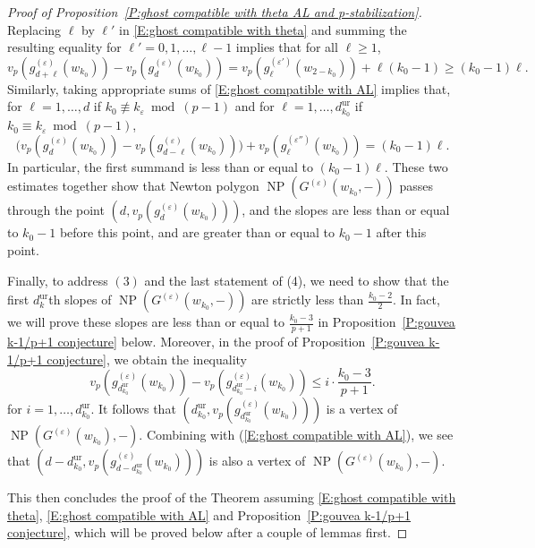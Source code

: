 \documentclass[12pt]{amsart}
\theoremstyle{definition}
\numberwithin{equation}{subsection}
\DeclareMathOperator{\NP}{NP}
\newcommand{\unr}{\mathrm{ur}}
\newcommand{\ur}{\mathrm{ur}}
\begin{document}
\begin{proof}[Proof of Proposition~\ref{P:ghost compatible with theta AL and p-stabilization}]
Replacing  $\ell$ by $\ell'$ in \eqref{E:ghost compatible with theta} and summing the resulting equality for $\ell' =0, 1, \dots, \ell-1$ implies that for all $\ell \geq 1$,
$$
v_p(g^{(\varepsilon)}_{d+\ell}(w_{k_0}))-v_p(g^{(\varepsilon)}_{d}(w_{k_0})) = v_p(g^{(\varepsilon')}_{\ell}(w_{2-{k_0}}))  +\ell({k_0}-1) \geq (k_0-1)\ell.
$$
Similarly, taking appropriate sums of \eqref{E:ghost compatible with AL} implies that, for $\ell = 1, \dots, d$ if ${k_0} \not\equiv k_\varepsilon \bmod{(p-1)}$ and for $\ell = 1, \dots, d_{k_0}^\unr$ if ${k_0} \equiv k_\varepsilon \bmod{(p-1)}$,
$$
\big(v_p(g^{(\varepsilon)}_d(w_{k_0})) - v_p(g^{(\varepsilon)}_{d-\ell}(w_{k_0})) \big) + v_p(g_\ell^{(\varepsilon'')}(w_{k_0})) = (k_0-1) \ell.
$$
In particular, the first summand is less than or equal to $(k_0-1)\ell$.
These two estimates together show that Newton polygon $\NP(G^{(\varepsilon)}(w_{k_0}, -))$ passes through the point $(d, v_p(g_d^{(\varepsilon)}(w_{k_0})))$, and the slopes are less than or equal to ${k_0}-1$ before this point, and are greater than or equal to ${k_0}-1$ after this point.

Finally, to address $(3)$ and the last statement of (4), we need to show that the first $d_{k}^\unr$th slopes of $\NP(G^{(\varepsilon)}(w_{k_0}, -))$ are strictly less than $\frac{k_0-2}2$. In fact, we will prove these slopes are less than or equal to $\frac{k_0-3}{p+1}$ in Proposition~\ref{P:gouvea k-1/p+1 conjecture} below. Moreover, in the proof of Proposition~\ref{P:gouvea k-1/p+1 conjecture}, we obtain the inequality
$$
v_p(g^{(\varepsilon)}_{d_{k_0}^\unr}(w_{k_0})) - v_p(g^{(\varepsilon)}_{d_{k_0}^\unr-i}(w_{k_0})) \leq i \cdot \frac{k_0-3}{p+1}.
$$
for $i=1,\dots,d_{k_0}^\unr$. It follows that $(d_{k_0}^\ur,v_p(g_{d_{k_0}^\ur}^{(\varepsilon)}(w_{k_0})))$ is a vertex of $\NP(G^{(\varepsilon)}(w_{k_0}),-)$. Combining with (\ref{E:ghost compatible with AL}), we see that $(d-d_{k_0}^\ur,v_p(g_{d-d_{k_0}^\ur}^{(\varepsilon)}(w_{k_0})))$ is also a vertex of $\NP(G^{(\varepsilon)}(w_{k_0}),-)$.

 This then concludes the proof of the Theorem assuming \eqref{E:ghost compatible with theta}, \eqref{E:ghost compatible with AL} and Proposition~\ref{P:gouvea k-1/p+1 conjecture}, which will be proved below after a  couple of  lemmas first.
\end{proof}
\end{document}
